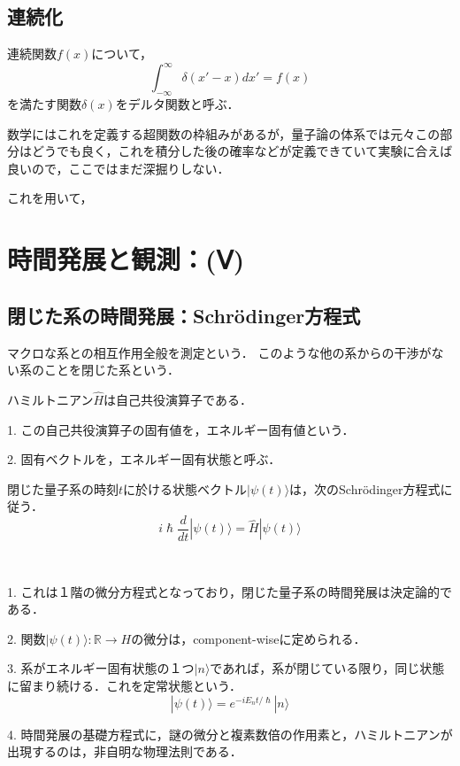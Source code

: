 \documentclass[uplatex, dvipdfmx]{jsreport}
\begin{document}
\subsection{連続化}

\begin{definition}
    連続関数$f(x)$について，
    \[ \int^\infty_{-\infty}\delta (x'-x)dx'=f(x) \]
    を満たす関数$\delta(x)$をデルタ関数と呼ぶ．
\end{definition}
\begin{remark}
    数学にはこれを定義する超関数の枠組みがあるが，量子論の体系では元々この部分はどうでも良く，これを積分した後の確率などが定義できていて実験に合えば良いので，ここではまだ深掘りしない．
\end{remark}

これを用いて，

\section{時間発展と観測：(Ⅴ)}

\subsection{閉じた系の時間発展：Schrödinger方程式}

\begin{definition}
    マクロな系との相互作用全般を測定という．
    このような他の系からの干渉がない系のことを閉じた系という．
\end{definition}

\begin{definition}
    ハミルトニアン$\hat{H}$は自己共役演算子である．

    1. この自己共役演算子の固有値を，エネルギー固有値という．

    2. 固有ベクトルを，エネルギー固有状態と呼ぶ．
\end{definition}

\begin{axiom}
    閉じた量子系の時刻$t$に於ける状態ベクトル$|\psi(t)\rangle$は，次のSchrödinger方程式に従う．
    \[ i\hslash\frac{d}{dt}|\psi(t)\rangle = \hat{H}|\psi (t)\rangle \]
\end{axiom}
\begin{remark}　

    1. これは１階の微分方程式となっており，閉じた量子系の時間発展は決定論的である．

    2. 関数$|\psi(t)\rangle:\mathbb{R}\to H$の微分は，component-wiseに定められる．

    3. 系がエネルギー固有状態の１つ$|n\rangle$であれば，系が閉じている限り，同じ状態に留まり続ける．これを定常状態という．
    \[ |\psi(t)\rangle = e^{-iE_nt/\hslash}|n\rangle \]

    4. 時間発展の基礎方程式に，謎の微分と複素数倍の作用素と，ハミルトニアンが出現するのは，非自明な物理法則である．
\end{remark}
\end{document}
